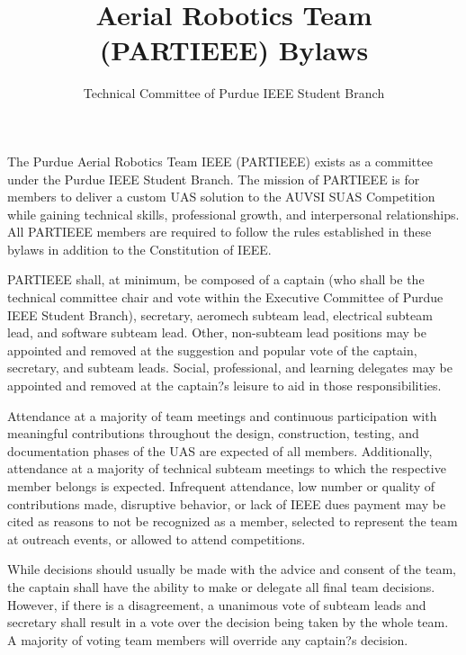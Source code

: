 \documentclass[12pt]{constitution}
\title{Aerial Robotics Team (PARTIEEE) Bylaws}
\author{Technical Committee of Purdue IEEE Student Branch}
\date{}
\begin{document}

\titlecontentspage
\newpage


\label{art:preamble}

The Purdue Aerial Robotics Team IEEE (PARTIEEE) exists as a committee under the Purdue IEEE Student Branch. The mission of PARTIEEE is for members to deliver a custom UAS solution to the AUVSI SUAS Competition while gaining technical skills, professional growth, and interpersonal relationships. All PARTIEEE members are required to follow the rules established in these bylaws in addition to the Constitution of IEEE.


\label{art:structmem}

PARTIEEE shall, at minimum, be composed of a captain (who shall be the technical committee chair and vote within the Executive Committee of Purdue IEEE Student Branch), secretary, aeromech subteam lead, electrical subteam lead, and software subteam lead. Other, non-subteam lead positions may be appointed and removed at the suggestion and popular vote of the captain, secretary, and subteam leads. Social, professional, and learning delegates may be appointed and removed at the captain?s leisure to aid in those responsibilities.

Attendance at a majority of team meetings and continuous participation with meaningful contributions throughout the design, construction, testing, and documentation phases of the UAS are expected of all members. Additionally, attendance at a majority of technical subteam meetings to which the respective member belongs is expected. Infrequent attendance, low number or quality of contributions made, disruptive behavior, or lack of IEEE dues payment may be cited as reasons to not be recognized as a member, selected to represent the team at outreach events, or allowed to attend competitions.


\label{art:decide}

While decisions should usually be made with the advice and consent of the team, the captain shall have the ability to make or delegate all final team decisions. However, if there is a disagreement, a unanimous vote of subteam leads and secretary shall result in a vote over the decision being taken by the whole team. A majority of voting team members will override any captain?s decision.
\end{document}
